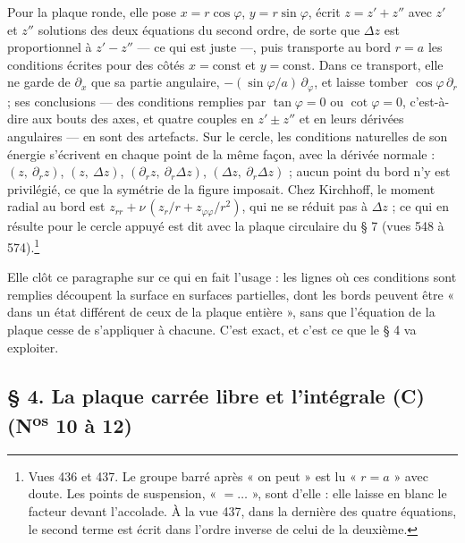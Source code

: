 \documentclass[11pt,a4paper]{article}
\begin{document}
Pour la plaque ronde, elle pose $x = r\cos\varphi$, $y = r\sin\varphi$, écrit
$z = z' + z''$ avec $z'$ et $z''$ solutions des deux équations du second ordre, de
sorte que $\Delta z$ est proportionnel à $z' - z''$ — ce qui est juste —, puis
transporte au bord $r = a$ les conditions écrites pour des côtés $x = \text{const}$ et
$y = \text{const}$. Dans ce transport, elle ne garde de $\partial_x$ que sa partie
angulaire, $-(\sin\varphi/a)\,\partial_\varphi$, et laisse tomber
$\cos\varphi\,\partial_r$ ; ses conclusions — des conditions remplies par
$\tan\varphi = 0$ ou $\cot\varphi = 0$, c'est-à-dire aux bouts des axes, et quatre
couples en $z' \pm z''$ et en leurs dérivées angulaires — en sont des artefacts. Sur
le cercle, les conditions naturelles de son énergie s'écrivent en chaque point de la
même façon, avec la dérivée normale : $(z,\ \partial_r z)$, $(z,\ \Delta z)$,
$(\partial_r z,\ \partial_r\Delta z)$, $(\Delta z,\ \partial_r\Delta z)$ ; aucun point
du bord n'y est privilégié, ce que la symétrie de la figure imposait. Chez Kirchhoff,
le moment radial au bord est
$z_{rr} + \nu\,(z_r/r + z_{\varphi\varphi}/r^2)$, qui ne se réduit pas à
$\Delta z$ ; ce qui en résulte pour le cercle appuyé est dit avec la plaque
circulaire du § 7 (vues 548 à 574).\footnote{Vues 436 et 437. Le groupe barré après « on peut » est lu
« $r=a$ » avec doute. Les points de suspension, « $=\ldots$ », sont d'elle : elle laisse
en blanc le facteur devant l'accolade. À la vue 437, dans la dernière des quatre
équations, le second terme est écrit dans l'ordre inverse de celui de la deuxième.}

Elle clôt ce paragraphe sur ce qui en fait l'usage : les lignes où ces conditions sont
remplies découpent la surface en surfaces partielles, dont les bords peuvent être
« dans un état différent de ceux de la plaque entière », sans que l'équation de la
plaque cesse de s'appliquer à chacune. C'est exact, et c'est ce que le § 4 va
exploiter.

\subsection*{§ 4. La plaque carrée libre et l'intégrale (C) (N\textsuperscript{os} 10 à 12)}
\end{document}
